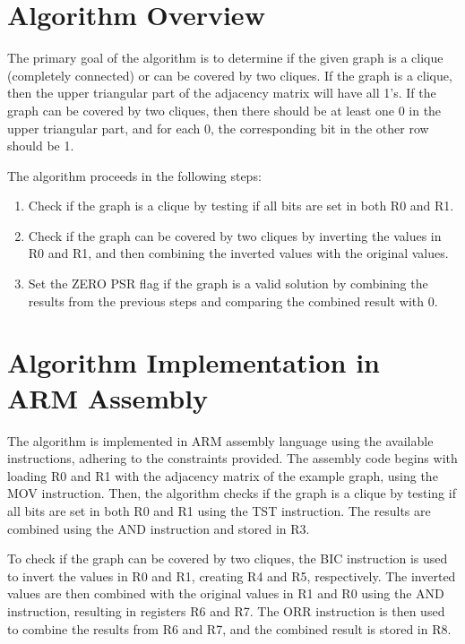 \section{Algorithm Overview}

The primary goal of the algorithm is to determine if the given graph is a clique (completely connected) or can be covered by two cliques. If the graph is a clique, then the upper triangular part of the adjacency matrix will have all 1's. If the graph can be covered by two cliques, then there should be at least one 0 in the upper triangular part, and for each 0, the corresponding bit in the other row should be 1.

The algorithm proceeds in the following steps:

\begin{enumerate}
    \item Check if the graph is a clique by testing if all bits are set in both R0 and R1.
    \item Check if the graph can be covered by two cliques by inverting the values in R0 and R1, and then combining the inverted values with the original values.
    \item Set the ZERO PSR flag if the graph is a valid solution by combining the results from the previous steps and comparing the combined result with 0.
\end{enumerate}

\section{Algorithm Implementation in ARM Assembly}

The algorithm is implemented in ARM assembly language using the available instructions, adhering to the constraints provided. The assembly code begins with loading R0 and R1 with the adjacency matrix of the example graph, using the MOV instruction. Then, the algorithm checks if the graph is a clique by testing if all bits are set in both R0 and R1 using the TST instruction. The results are combined using the AND instruction and stored in R3.

To check if the graph can be covered by two cliques, the BIC instruction is used to invert the values in R0 and R1, creating R4 and R5, respectively. The inverted values are then combined with the original values in R1 and R0 using the AND instruction, resulting in registers R6 and R7. The ORR instruction is then used to combine the results from R6 and R7, and the combined result is stored in R8.

